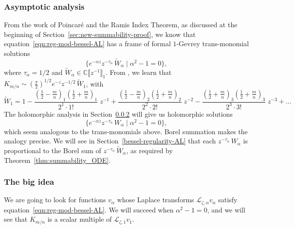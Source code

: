 \documentclass{article}
\newcommand{\C}{\mathbb{C}}
\newcommand{\series}[1]{\tilde{#1}}
\newcommand{\laplace}{\mathcal{L}}
\theoremstyle{definition}
\theoremstyle{plain}
\begin{document}
\subsubsection{Asymptotic analysis}\label{sec:asympt-AL}
%
From the work of Poincar\'{e} and the Ramis Index Theorem, as discussed at the beginning of Section~\ref{sec:new-summability-proof}, we know that equation~\eqref{eqn:reg-mod-bessel-AL} has a frame of formal $1$-Gevrey trans-monomial solutions
\[ \{ e^{-\alpha z} z^{-\tau_\alpha}\,\series{W}_\alpha \mid \alpha^2 - 1 = 0 \}, \]
where $\tau_\alpha = 1/2$ and $\series{W}_\alpha\in\C\llbracket z^{-1} \rrbracket_1$. From \cite[Equations 10.40.2 and 10.17.1]{dlmf}, we learn that $K_{m/n} \sim \left(\tfrac{\pi}{2}\right)^{1/2} e^{-z} z^{-1/2}\,\series{W}_1$, with
\begin{equation}\label{bessel-asymp-AL}
\series{W}_1 = 1 - \frac{\left(\tfrac{1}{2}-\tfrac{m}{n}\right)_1 \left(\tfrac{1}{2}+\frac{m}{n}\right)_1}{2^1 \cdot 1!}\;z^{-1} + \frac{\left(\tfrac{1}{2}-\tfrac{m}{n}\right)_2 \left(\tfrac{1}{2}+\tfrac{m}{n}\right)_2}{2^2 \cdot 2!}\;z^{-2} - \frac{\left(\tfrac{1}{2}+\tfrac{m}{n}\right)_3 \left(\tfrac{1}{2}+\tfrac{m}{n}\right)_3}{2^3 \cdot 3!}\;z^{-3} + \ldots
\end{equation}
%
The holomorphic analysis in Section~\ref{big-idea} will give us holomorphic solutions
\[ \{ e^{-\alpha z} z^{-\tau_\alpha}\,W_\alpha \mid \alpha^2 - 1 = 0 \}, \]
which seem analogous to the trans-monomials above. Borel summation makes the analogy precise. We will see in Section~\ref{bessel-regularity-AL} that each $z^{-\tau_\alpha}\,W_\alpha$ is proportional to the Borel sum of $z^{-\tau_\alpha}\,\series{W}_\alpha$, as required by Theorem~\ref{thm:summability_ODE}.
%
\subsubsection{The big idea}\label{big-idea}
%
We are going to look for functions $v_\alpha$ whose Laplace transforms $\laplace_{\zeta, \alpha} v_\alpha$ satisfy equation~\eqref{eqn:reg-mod-bessel-AL}. We will succeed when $\alpha^2 - 1 = 0$, and we will see that $K_{m/n}$ is a scalar multiple of $\laplace_{\zeta, 1} v_1$.
\end{document}
